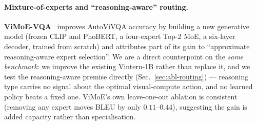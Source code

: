 \paragraph{Mixture-of-experts and ``reasoning-aware'' routing.}
\textbf{ViMoE-VQA}~\cite{vimoevqa} improves AutoViVQA accuracy by building a new
generative model (frozen CLIP and PhoBERT, a four-expert Top-2 MoE, a six-layer
decoder, trained from scratch) and attributes part of its gain to
``approximate reasoning-aware expert selection''. We are a direct counterpoint on
the \emph{same benchmark}: we improve the existing Vintern-1B rather than replace
it, and we test the reasoning-aware premise directly
(Sec.~\ref{sec:abl-routing}) --- reasoning type carries no signal about the
optimal visual-compute action, and no learned policy beats a fixed one. ViMoE's
own leave-one-out ablation is consistent (removing any expert moves BLEU by only
$0.11$--$0.44$), suggesting the gain is added capacity rather than specialisation.
